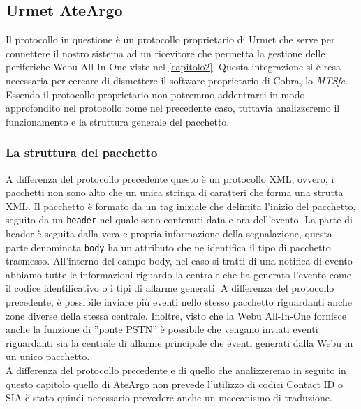 \subsection{Urmet AteArgo}
Il protocollo in questione è un protocollo proprietario di Urmet che serve per connettere il nostro sistema ad un ricevitore che permetta la gestione delle periferiche Webu All-In-One viste nel \chaptername \ref{capitolo2}. Questa integrazione si è resa necessaria per cercare di dismettere il software proprietario di Cobra, lo \emph{MTSfe}.\\
Essendo il protocollo proprietario non potremmo addentrarci in modo approfondito nel protocollo come nel precedente caso, tuttavia analizzeremo il funzionamento e la struttura generale del pacchetto.
\subsubsection{La struttura del pacchetto}
A differenza del protocollo precedente questo è un protocollo XML, ovvero, i pacchetti non sono alto che un unica stringa di caratteri che forma una strutta XML.
Il pacchetto è formato da un tag iniziale che delimita l'inizio del pacchetto, seguito da un \texttt{header} nel quale sono contenuti data e ora dell'evento. La parte di header è seguita dalla vera e propria informazione della segnalazione, questa parte denominata \texttt{body} ha un attributo che ne identifica il tipo di pacchetto trasmesso. All'interno del campo body, nel caso si tratti di una notifica di evento abbiamo tutte le informazioni riguardo la centrale che ha generato l'evento come il codice identificativo o i tipi di allarme generati. A differenza del protocollo precedente, è possibile inviare più eventi nello stesso pacchetto riguardanti anche zone diverse della stessa centrale. Inoltre, visto che la Webu All-In-One fornisce anche la funzione di ''ponte PSTN'' è possibile che vengano inviati eventi riguardanti sia la centrale di allarme principale che eventi generati dalla Webu in un unico pacchetto.\\
A differenza del protocollo precedente e di quello che analizzeremo in seguito in questo capitolo quello di AteArgo non prevede l'utilizzo di codici Contact ID o SIA è stato quindi necessario prevedere anche un meccanismo di traduzione.
